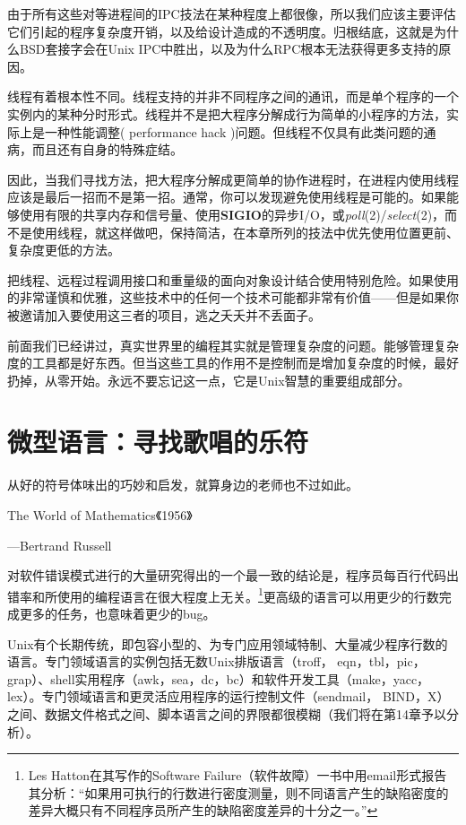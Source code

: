 \documentclass[12pt,oneside]{book}
\begin{document}
\begin{common-format}
由于所有这些对等进程间的IPC技法在某种程度上都很像，所以我们应该主要评估它们引起的程序复杂度开销，以及给设计造成的不透明度。归根结底，这就是为什么BSD套接字会在Unix IPC中胜出，以及为什么RPC根本无法获得更多支持的原因。

线程有着根本性不同。线程支持的并非不同程序之间的通讯，而是单个程序的一个实例内的某种分时形式。线程并不是把大程序分解成行为简单的小程序的方法，实际上是一种性能调整( performance hack )问题。但线程不仅具有此类问题的通病，而且还有自身的特殊症结。

因此，当我们寻找方法，把大程序分解成更简单的协作进程时，在进程内使用线程应该是最后一招而不是第一招。通常，你可以发现避免使用线程是可能的。如果能够使用有限的共享内存和信号量、使用\textbf{SIGIO}的异步I/O，或\textit{poll}(2)/\textit{select}(2)，而不是使用线程，就这样做吧，保持简洁，在本章所列的技法中优先使用位置更前、复杂度更低的方法。

把线程、远程过程调用接口和重量级的面向对象设计结合使用特别危险。如果使用的非常谨慎和优雅，这些技术中的任何一个技术可能都非常有价值——但是如果你被邀请加入要使用这三者的项目，逃之夭夭并不丢面子。

前面我们已经讲过，真实世界里的编程其实就是管理复杂度的问题。能够管理复杂度的工具都是好东西。但当这些工具的作用不是控制而是增加复杂度的时候，最好扔掉，从零开始。永远不要忘记这一点，它是Unix智慧的重要组成部分。


\chapter{微型语言：寻找歌唱的乐符}
\begin{flushright}
\begin{notecard}{23em}
从好的符号体味出的巧妙和启发，就算身边的老师也不过如此。
 
{\hfill  The World of Mathematics《1956》} 
 
{\hfill —Bertrand Russell}
\end{notecard}
\end{flushright}

对软件错误模式进行的大量研究得出的一个最一致的结论是，程序员每百行代码出错率和所使用的编程语言在很大程度上无关。\footnote{Les Hatton在其写作的Software Failure（软件故障）一书中用email形式报告其分析：“如果用可执行的行数进行密度测量，则不同语言产生的缺陷密度的差异大概只有不同程序员所产生的缺陷密度差异的十分之一。”}更高级的语言可以用更少的行数完成更多的任务，也意味着更少的bug。

Unix有个长期传统，即包容小型的、为专门应用领域特制、大量减少程序行数的语言。专门领域语言的实例包括无数Unix排版语言（troff， eqn，tbl，pic，grap）、shell实用程序（awk，sea，dc，bc）和软件开发工具（make，yacc，lex）。专门领域语言和更灵活应用程序的运行控制文件（sendmail， BIND，X）之间、数据文件格式之间、脚本语言之间的界限都很模糊（我们将在第14章予以分析）。


\end{common-format}
\end{document}
